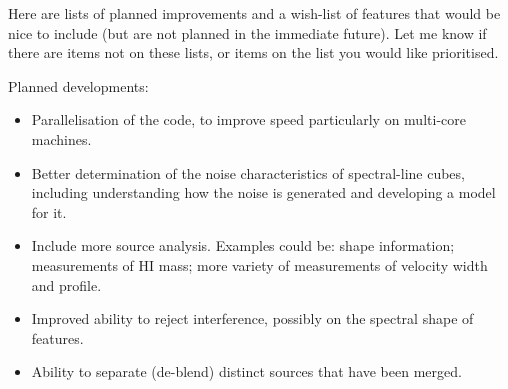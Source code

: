 %
%
%
%

Here are lists of planned improvements and a wish-list of
features that would be nice to include (but are not planned in the
immediate future). Let me know if there are items not on these lists,
or items on the list you would like prioritised.

Planned developments:
\begin{itemize}
\item Parallelisation of the code, to improve speed particularly on
multi-core machines.

\item Better determination of the noise characteristics of
  spectral-line cubes, including understanding how the noise is
  generated and developing a model for it. 
  
\item Include more source analysis. Examples could be: shape
  information; measurements of HI mass; more variety of measurements
  of velocity width and profile. 

\item Improved ability to reject interference, possibly on the
  spectral shape of features.

\item Ability to separate (de-blend) distinct sources that have been
  merged.
\end{itemize}

